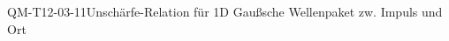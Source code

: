 
\begin{CONC}{QM-T12-03-11}{Unschärfe-Relation für 1D Gaußsche Wellenpaket zw. Impuls und Ort}
\end{CONC}
